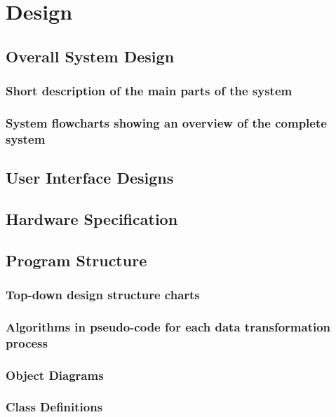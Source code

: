 \chapter{Design}

\section{Overall System Design}

\subsection{Short description of the main parts of the system}

\subsection{System flowcharts showing an overview of the complete system}

\section{User Interface Designs}

\section{Hardware Specification}

\section{Program Structure}

\subsection{Top-down design structure charts}

\subsection{Algorithms in pseudo-code for each data transformation process}

\subsection{Object Diagrams}

\subsection{Class Definitions}


